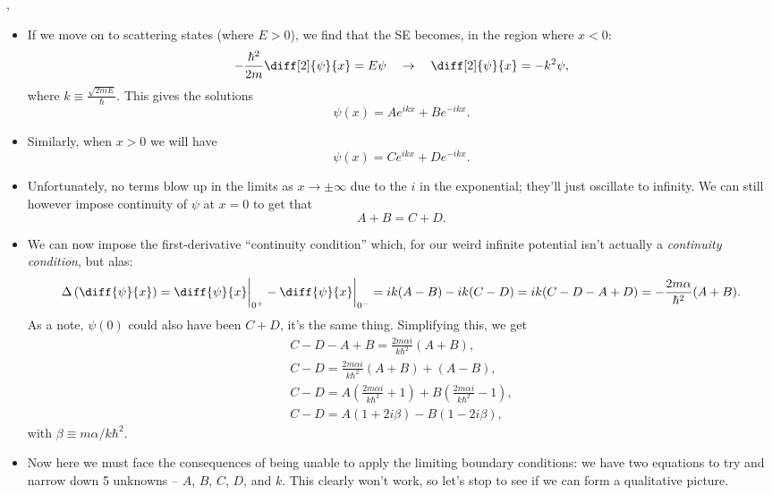 \sep

\begin{itemize}
    \item If we move on to scattering states (where $E>0$), we find that the SE becomes, in the region where $x<0$:
        \begin{equation*}
            -\frac{\hbar^2}{2m}\diff[2]{\psi}{x} = E\psi \quad \rightarrow \quad \diff[2]{\psi}{x} = -k^2\psi,
        \end{equation*}
        where $k \equiv \frac{\sqrt{2mE}}{\hbar}$. This gives the solutions
        \begin{equation*}
            \psi(x) = Ae^{ikx} + Be^{-ikx}.
        \end{equation*}
    \item Similarly, when $x>0$ we will have
        \begin{equation*}
            \psi(x) = Ce^{ikx} + De^{-ikx}.
        \end{equation*}
    \item Unfortunately, no terms blow up in the limits as $x \rightarrow \pm\infty$ due to the $i$ in the exponential; they'll just oscillate to infinity. We can still however impose continuity of $\psi$ at $x=0$ to get that
        \begin{equation*}
            A+B = C+D.
        \end{equation*}
    \item We can now impose the first-derivative ``continuity condition'' which, for our weird infinite potential isn't actually a \textit{continuity condition}, but alas:
        \begin{equation*}
            \Delta\left( \diff{\psi}{x} \right) = \diff{\psi}{x}\bigg|_{0^+} - \diff{\psi}{x}\bigg|_{0^-} = ik(A-B) - ik(C-D) = ik(C-D-A+D) = -\frac{2m\alpha}{\hbar^2} (A+B).
        \end{equation*}
        As a note, $\psi(0)$ could also have been $C+D$, it's the same thing. Simplifying this, we get
        \begin{gather*}
            C-D-A+B = \frac{2m \alpha i}{k\hbar^2} (A+B), \\
            C-D = \frac{2m\alpha i}{k\hbar^2}(A+B) + (A-B), \\
            C-D = A\left( \frac{2m \alpha i}{k\hbar^2} + 1 \right) + B\left( \frac{2m \alpha i}{k\hbar^2} - 1 \right), \\
            C-D = A(1+2i\beta) - B(1-2i\beta),
        \end{gather*}
        with $\beta \equiv m\alpha/k\hbar^2$.
    \item Now here we must face the consequences of being unable to apply the limiting boundary conditions: we have two equations to try and narrow down 5 unknowns -- $A$, $B$, $C$, $D$, and $k$. This clearly won't work, so let's stop to see if we can form a qualitative picture.
\end{itemize}

